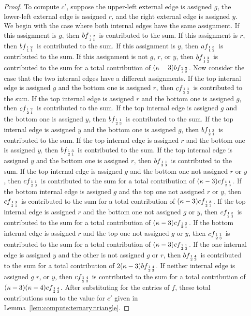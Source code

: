 \documentclass[11pt]{article}
\newcommand{\subMat}[4]{\mbox{\scriptsize $\begin{smallmatrix} #1 & #4 \\ #2 & #3 \end{smallmatrix}$}}
\begin{document}
\begin{proof}
 To compute $c'$,
 suppose the upper-left external edge is assigned $g$,
 the lower-left external edge is assigned $r$,
 and the right external edge is assigned $y$.
 We begin with the case where both internal edges have the same assignment.
 If this assignment is $g$,
 then $b f_{\subMat{1}{1}{1}{2}}$ is contributed to the sum.
 If this assignment is $r$,
 then $b f_{\subMat{1}{1}{1}{2}}$ is contributed to the sum.
 If this assignment is $y$,
 then $a f_{\subMat{1}{1}{2}{3}}$ is contributed to the sum.
 If this assignment is not $g$, $r$, or $y$,
 then $b f_{\subMat{1}{1}{2}{3}}$ is contributed to the sum
 for a total contribution of $(\kappa - 3) b f_{\subMat{1}{1}{2}{3}}$.
 Now consider the case that the two internal edges have a different assignments.
 If the top internal edge is assigned $g$ and the bottom one is assigned $r$,
 then $c f_{\subMat{1}{2}{2}{1}}$ is contributed to the sum.
 If the top internal edge is assigned $r$ and the bottom one is assigned $g$,
 then $c f_{\subMat{1}{2}{1}{2}}$ is contributed to the sum.
 If the top internal edge is assigned $g$ and the bottom one is assigned $y$,
 then $b f_{\subMat{1}{2}{3}{1}}$ is contributed to the sum.
 If the top internal edge is assigned $y$ and the bottom one is assigned $g$,
 then $b f_{\subMat{1}{2}{1}{3}}$ is contributed to the sum.
 If the top internal edge is assigned $r$ and the bottom one is assigned $y$,
 then $b f_{\subMat{1}{2}{1}{3}}$ is contributed to the sum.
 If the top internal edge is assigned $y$ and the bottom one is assigned $r$,
 then $b f_{\subMat{1}{2}{3}{1}}$ is contributed to the sum.
 If the top internal edge is assigned $g$ and the bottom one not assigned $r$ or $y$,
 then $c f_{\subMat{1}{2}{3}{1}}$ is contributed to the sum
 for a total contribution of $(\kappa - 3) c f_{\subMat{1}{2}{3}{1}}$.
 If the bottom internal edge is assigned $g$ and the top one not assigned $r$ or $y$,
 then $c f_{\subMat{1}{2}{1}{3}}$ is contributed to the sum
 for a total contribution of $(\kappa - 3) c f_{\subMat{1}{2}{1}{3}}$.
 If the top internal edge is assigned $r$ and the bottom one not assigned $g$ or $y$,
 then $c f_{\subMat{1}{2}{1}{3}}$ is contributed to the sum
 for a total contribution of $(\kappa - 3) c f_{\subMat{1}{2}{1}{3}}$.
 If the bottom internal edge is assigned $r$ and the top one not assigned $g$ or $y$,
 then $c f_{\subMat{1}{2}{3}{1}}$ is contributed to the sum
 for a total contribution of $(\kappa - 3) c f_{\subMat{1}{2}{3}{1}}$.
 If the one internal edge is assigned $y$ and the other is not assigned $g$ or $r$,
 then $b f_{\subMat{1}{2}{3}{4}}$ is contributed to the sum
 for a total contribution of $2 (\kappa - 3) b f_{\subMat{1}{2}{3}{4}}$.
 If neither internal edge is assigned $g$ $r$, or $y$,
 then $c f_{\subMat{1}{2}{3}{4}}$ is contributed to the sum
 for a total contribution of $(\kappa - 3) (\kappa - 4) c f_{\subMat{1}{2}{3}{4}}$.
 After substituting for the entries of $f$,
 these total contributions sum to the value for $c'$ given in Lemma~\ref{lem:compute:ternary:triangle}.
\end{proof}
\end{document}
